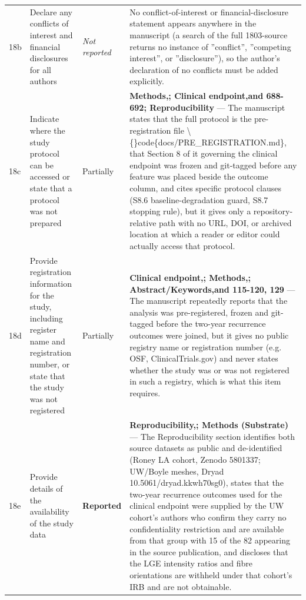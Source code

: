 \documentclass[10pt]{article}
\begin{document}
\begin{longtable}{@{}p{0.9cm} p{6.2cm} p{1.9cm} p{12.4cm}@{}}
18b & Declare any conflicts of interest and financial disclosures for all authors & \emph{Not reported} & No conflict-of-interest or financial-disclosure statement appears anywhere in the manuscript (a search of the full 1803-source returns no instance of ''conflict'', ''competing interest'', or ''disclosure''), so the author's declaration of no conflicts must be added explicitly. \\[2pt]
18c & Indicate where the study protocol can be accessed or state that a protocol was not prepared & Partially & \textbf{Methods,; Clinical endpoint,and 688-692; Reproducibility} --- The manuscript states that the full protocol is the pre-registration file \textbackslash\{\}code\{docs/PRE\_REGISTRATION.md\}, that Section 8 of it governing the clinical endpoint was frozen and git-tagged before any feature was placed beside the outcome column, and cites specific protocol clauses (S8.6 baseline-degradation guard, S8.7 stopping rule), but it gives only a repository-relative path with no URL, DOI, or archived location at which a reader or editor could actually access that protocol. \\[2pt]
18d & Provide registration information for the study, including register name and registration number, or state that the study was not registered & Partially & \textbf{Clinical endpoint,; Methods,; Abstract/Keywords,and 115-120, 129} --- The manuscript repeatedly reports that the analysis was pre-registered, frozen and git-tagged before the two-year recurrence outcomes were joined, but it gives no public registry name or registration number (e.g. OSF, ClinicalTrials.gov) and never states whether the study was or was not registered in such a registry, which is what this item requires. \\[2pt]
18e & Provide details of the availability of the study data & \textbf{Reported} & \textbf{Reproducibility,; Methods (Substrate)} --- The Reproducibility section identifies both source datasets as public and de-identified (Roney LA cohort, Zenodo 5801337; UW/Boyle meshes, Dryad 10.5061/dryad.kkwh70sg0), states that the two-year recurrence outcomes used for the clinical endpoint were supplied by the UW cohort's authors who confirm they carry no confidentiality restriction and are available from that group with 15 of the 82 appearing in the source publication, and discloses that the LGE intensity ratios and fibre orientations are withheld under that cohort's IRB and are not obtainable. \\[2pt]

\end{longtable}
\end{document}
